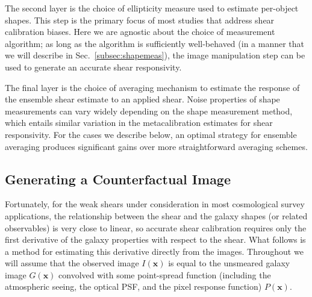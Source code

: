 \documentclass[iop]{emulateapj}
\begin{document}
The second layer is the choice of ellipticity measure used to estimate
per-object shapes. This step is the primary focus of most studies that
address shear calibration biases. Here we are agnostic about the
choice of measurement algorithm; as long as the algorithm is
sufficiently well-behaved (in a manner that we will describe in
Sec.~\ref{subsec:shapemeas}), the image manipulation step can be used
to generate an accurate shear responsivity.

The final layer is the choice of averaging mechanism to estimate the
response of the ensemble shear estimate to an applied shear. Noise
properties of shape measurements can vary widely depending on the
shape measurement method, which entails similar variation in the
metacalibration estimates for shear responsivity. For the cases we
describe below, an optimal strategy for ensemble averaging produces
significant gains over more straightforward averaging schemes.

\subsection{Generating a Counterfactual Image}
\label{sec:counterfactual}
Fortunately, for the weak shears under consideration in most
cosmological survey applications, the relationship between the shear
and the galaxy shapes (or related observables) is very close to
linear, so accurate shear calibration requires only the first
derivative of the galaxy properties with respect to the shear. What
follows is a method for estimating this derivative directly from the
images. Throughout we will assume that the observed image
$I({\mathbf{x}})$ is equal to the unsmeared galaxy image
$G(\mathbf{x})$ convolved with some point-spread function (including the
atmospheric seeing, the optical PSF, and the pixel response function) $P(\mathbf{x})$.
\end{document}
